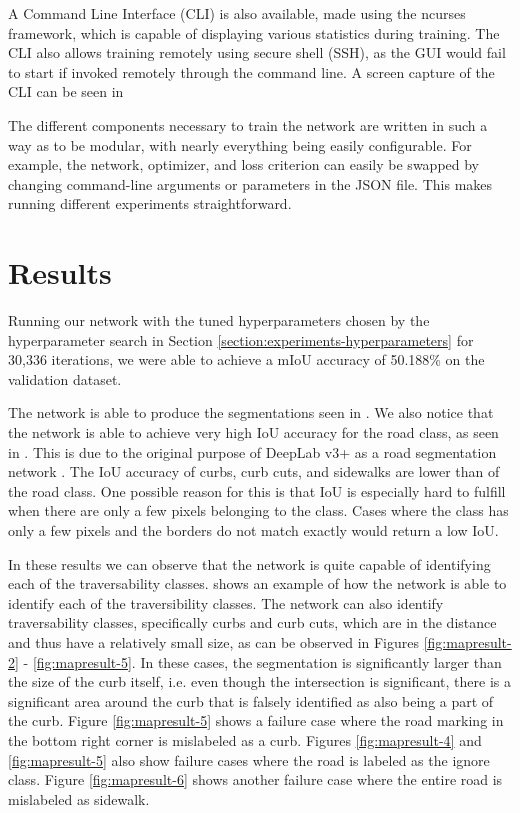 A Command Line Interface (CLI) is also available, made using the ncurses framework, which is capable of displaying various statistics during training.
The CLI also allows training remotely using secure shell (SSH), as the GUI would fail to start if invoked remotely through the command line.
A screen capture of the CLI can be seen in 



The different components necessary to train the network are written in such a way as to be modular, with nearly everything being easily configurable.
For example, the network, optimizer, and loss criterion can easily be swapped by changing command-line arguments or parameters in the JSON file.
This makes running different experiments straightforward.

\section{Results}\label{section:experiments-results}
Running our network with the tuned hyperparameters chosen by the hyperparameter search in Section \ref{section:experiments-hyperparameters} for 30,336 iterations, we were able to achieve a mIoU accuracy of 50.188\% on the validation dataset.



The network is able to produce the segmentations seen in .
We also notice that the network is able to achieve very high IoU accuracy for the road class, as seen in .
This is due to the original purpose of DeepLab v3+ as a road segmentation network \cite{deeplab}.
The IoU accuracy of curbs, curb cuts, and sidewalks are lower than of the road class.
One possible reason for this is that IoU is especially hard to fulfill when there are only a few pixels belonging to the class.
Cases where the class has only a few pixels and the borders do not match exactly would return a low IoU.




In these results we can observe that the network is quite capable of identifying each of the traversability classes.
 shows an example of how the network is able to identify each of the traversibility classes.
The network can also identify traversability classes, specifically curbs and curb cuts, which are in the distance and thus have a relatively small size, as can be observed in Figures \ref{fig:mapresult-2} - \ref{fig:mapresult-5}.
In these cases, the segmentation is significantly larger than the size of the curb itself, i.e. even though the intersection is significant, there is a significant area around the curb that is falsely identified as also being a part of the curb.
Figure \ref{fig:mapresult-5} shows a failure case where the road marking in the bottom right corner is mislabeled as a curb.
Figures \ref{fig:mapresult-4} and \ref{fig:mapresult-5} also show failure cases where the road is labeled as the ignore class.
Figure \ref{fig:mapresult-6} shows another failure case where the entire road is mislabeled as sidewalk.

